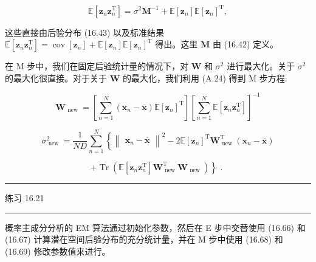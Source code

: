 \documentclass[10pt]{article}
\newcommand{\HRule}{\begin{center}\rule{0.9\linewidth}{0.2mm}\end{center}}
\begin{document}
\[
\mathbb{E}\left\lbrack  {{\mathbf{z}}_{n}{\mathbf{z}}_{n}^{\mathrm{T}}}\right\rbrack   = {\sigma }^{2}{\mathbf{M}}^{-1} + \mathbb{E}\left\lbrack  {\mathbf{z}}_{n}\right\rbrack  \mathbb{E}{\left\lbrack  {\mathbf{z}}_{n}\right\rbrack  }^{\mathrm{T}}, \tag{16.67}
\]

这些直接由后验分布 (16.43) 以及标准结果 \(\mathbb{E}\left\lbrack  {{\mathbf{z}}_{n}{\mathbf{z}}_{n}^{\mathrm{T}}}\right\rbrack   = \operatorname{cov}\left\lbrack  {\mathbf{z}}_{n}\right\rbrack   + \mathbb{E}\left\lbrack  {\mathbf{z}}_{n}\right\rbrack  \mathbb{E}{\left\lbrack  {\mathbf{z}}_{n}\right\rbrack  }^{\mathrm{T}}\) 得出。这里 \(\mathbf{M}\) 由 (16.42) 定义。

在 M 步中，我们在固定后验统计量的情况下，对 \(\mathbf{W}\) 和 \({\sigma }^{2}\) 进行最大化。关于 \({\sigma }^{2}\) 的最大化很直接。对于关于 \(\mathbf{W}\) 的最大化，我们利用 (A.24) 得到 M 步方程:

\[
{\mathbf{W}}_{\text{ new }} = \left\lbrack  {\mathop{\sum }\limits_{{n = 1}}^{N}\left( {{\mathbf{x}}_{n} - \overline{\mathbf{x}}}\right) \mathbb{E}{\left\lbrack  {\mathbf{z}}_{n}\right\rbrack  }^{\mathrm{T}}}\right\rbrack  {\left\lbrack  \mathop{\sum }\limits_{{n = 1}}^{N}\mathbb{E}\left\lbrack  {\mathbf{z}}_{n}{\mathbf{z}}_{n}^{\mathrm{T}}\right\rbrack  \right\rbrack  }^{-1} \tag{16.68}
\]

\[
{\sigma }_{\text{ new }}^{2} = \frac{1}{ND}\mathop{\sum }\limits_{{n = 1}}^{N}\left\{  {{\begin{Vmatrix}{\mathbf{x}}_{n} - \overline{\mathbf{x}}\end{Vmatrix}}^{2} - 2\mathbb{E}{\left\lbrack  {\mathbf{z}}_{n}\right\rbrack  }^{\mathrm{T}}{\mathbf{W}}_{\text{ new }}^{\mathrm{T}}\left( {{\mathbf{x}}_{n} - \overline{\mathbf{x}}}\right) }\right.
\]

\[
\left. {+\operatorname{Tr}\left( {\mathbb{E}\left\lbrack  {{\mathbf{z}}_{n}{\mathbf{z}}_{n}^{\mathrm{T}}}\right\rbrack  {\mathbf{W}}_{\text{ new }}^{\mathrm{T}}{\mathbf{W}}_{\text{ new }}}\right) }\right\}  \text{ . } \tag{16.69}
\]

\HRule

练习 16.21

\HRule

概率主成分分析的 EM 算法通过初始化参数，然后在 E 步中交替使用 (16.66) 和 (16.67) 计算潜在空间后验分布的充分统计量，并在 M 步中使用 (16.68) 和 (16.69) 修改参数值来进行。
\end{document}
